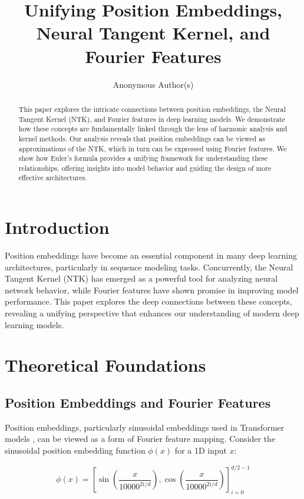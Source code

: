 \documentclass{article}
\title{Unifying Position Embeddings, Neural Tangent Kernel, and Fourier Features}
\author{Anonymous Author(s)}
\begin{document}
\maketitle

\begin{abstract}
This paper explores the intricate connections between position embeddings, the Neural Tangent Kernel (NTK), and Fourier features in deep learning models. We demonstrate how these concepts are fundamentally linked through the lens of harmonic analysis and kernel methods. Our analysis reveals that position embeddings can be viewed as approximations of the NTK, which in turn can be expressed using Fourier features. We show how Euler's formula provides a unifying framework for understanding these relationships, offering insights into model behavior and guiding the design of more effective architectures.
\end{abstract}

\section{Introduction}

Position embeddings have become an essential component in many deep learning architectures, particularly in sequence modeling tasks. Concurrently, the Neural Tangent Kernel (NTK) has emerged as a powerful tool for analyzing neural network behavior, while Fourier features have shown promise in improving model performance. This paper explores the deep connections between these concepts, revealing a unifying perspective that enhances our understanding of modern deep learning models.

\section{Theoretical Foundations}

\subsection{Position Embeddings and Fourier Features}

Position embeddings, particularly sinusoidal embeddings used in Transformer models \citep{Vaswani2017}, can be viewed as a form of Fourier feature mapping. Consider the sinusoidal position embedding function $\phi(x)$ for a 1D input $x$:

\begin{equation}
    \phi(x) = \left[\sin\left(\frac{x}{10000^{2i/d}}\right), \cos\left(\frac{x}{10000^{2i/d}}\right)\right]_{i=0}^{d/2-1}
\end{equation}
\end{document}

